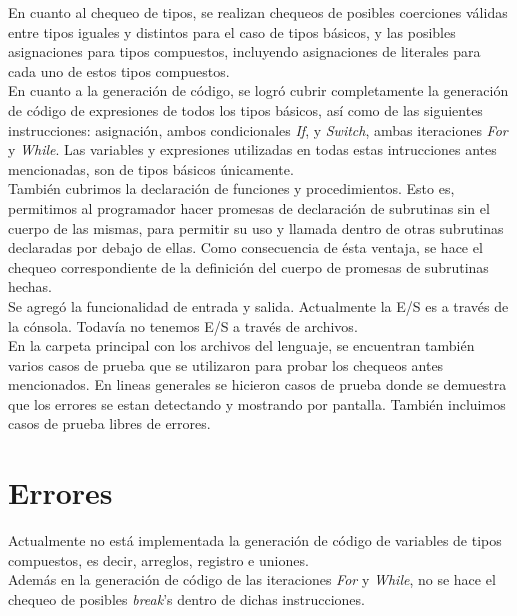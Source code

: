 \documentclass[11pt, spanish]{report}
\begin{document}
En cuanto al chequeo de tipos, se realizan chequeos de posibles coerciones v\'alidas entre tipos iguales y distintos para el caso de tipos b\'asicos, y las posibles
asignaciones para tipos compuestos, incluyendo asignaciones de literales para cada uno de estos tipos compuestos.\\

En cuanto a la generaci\'on de c\'odigo, se logr\'o cubrir completamente la generaci\'on de c\'odigo de expresiones de todos los tipos b\'asicos, as\'i como de las 
siguientes instrucciones: asignaci\'on, ambos condicionales \emph{If}, y \emph{Switch}, ambas iteraciones \emph{For} y \emph{While}. Las variables y expresiones 
utilizadas en todas estas intrucciones antes mencionadas, son de tipos b\'asicos \'unicamente.\\

Tambi\'en cubrimos la declaraci\'on de funciones y procedimientos. Esto es, permitimos al programador hacer promesas de declaraci\'on
de subrutinas sin el cuerpo de las mismas, para permitir su uso y llamada dentro de otras subrutinas declaradas por debajo de ellas. Como consecuencia de \'esta
ventaja, se hace el chequeo correspondiente de la definici\'on del cuerpo de promesas de subrutinas hechas.\\

Se agreg\'o la funcionalidad de entrada y salida. Actualmente la E/S es a trav\'es de la c\'onsola. Todav\'ia no tenemos E/S a trav\'es de archivos.\\

En la carpeta principal con los archivos del lenguaje, se encuentran tambi\'en varios casos de prueba que se utilizaron para probar los chequeos antes mencionados.
En lineas generales se hicieron casos de prueba donde se demuestra que los errores se estan detectando y mostrando por pantalla. Tambi\'en incluimos casos de prueba
libres de errores.\\

\section{Errores}

Actualmente no est\'a implementada la generaci\'on de c\'odigo de variables de tipos compuestos, es decir, arreglos, registro e uniones.\\

Adem\'as en la generaci\'on de c\'odigo de las iteraciones \emph{For} y \emph{While}, no se hace el chequeo de posibles \emph{break}'s dentro de dichas 
instrucciones.\\
\end{document}
